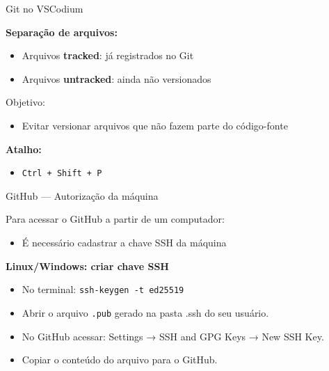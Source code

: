 \documentclass{beamer}
\begin{document}
\begin{frame}{Git no VSCodium}
    
    \textbf{Separação de arquivos:}
    \begin{itemize}
        \item Arquivos \textbf{tracked}: já registrados no Git
        \item Arquivos \textbf{untracked}: ainda não versionados
    \end{itemize}
    
    \vspace{0.3cm}
    
    Objetivo:
    \begin{itemize}
        \item Evitar versionar arquivos que não fazem parte do código-fonte
    \end{itemize}
    
    \vspace{0.3cm}
    
    \textbf{Atalho:}
    \begin{itemize}
        \item \texttt{Ctrl + Shift + P}
    \end{itemize}
    
\end{frame}

\begin{frame}{GitHub — Autorização da máquina}
    
    Para acessar o GitHub a partir de um computador:
    \begin{itemize}
        \item É necessário cadastrar a chave SSH da máquina
    \end{itemize}
    
    \vspace{0.3cm}
    
    \textbf{Linux/Windows: criar chave SSH}
    \begin{itemize}
        \item No terminal: \texttt{ssh-keygen -t ed25519}
        \item Abrir o arquivo \texttt{.pub} gerado na pasta .ssh do seu usuário.
        \item No GitHub acessar: Settings → SSH and GPG Keys → New SSH Key.
        \item Copiar o conteúdo do arquivo para o GitHub.
    \end{itemize}
    
    \vspace{0.2cm}
\end{frame}
\end{document}
